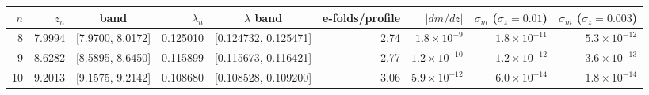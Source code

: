 \begin{tabular}{rrcrcrrrr}
\toprule
$n$ & $z_n$ & band & $\lambda_n$ & $\lambda$ band & e-folds/profile & $|dm/dz|$ & $\sigma_m$ ($\sigma_z=0.01$) & $\sigma_m$ ($\sigma_z=0.003$)\\
\midrule
8 & 7.9994 & [7.9700, 8.0172] & 0.125010 & [0.124732, 0.125471] & 2.74 & $1.8\times10^{-9}$ & $1.8\times10^{-11}$ & $5.3\times10^{-12}$\\
9 & 8.6282 & [8.5895, 8.6450] & 0.115899 & [0.115673, 0.116421] & 2.77 & $1.2\times10^{-10}$ & $1.2\times10^{-12}$ & $3.6\times10^{-13}$\\
10 & 9.2013 & [9.1575, 9.2142] & 0.108680 & [0.108528, 0.109200] & 3.06 & $5.9\times10^{-12}$ & $6.0\times10^{-14}$ & $1.8\times10^{-14}$\\
\bottomrule
\end{tabular}
